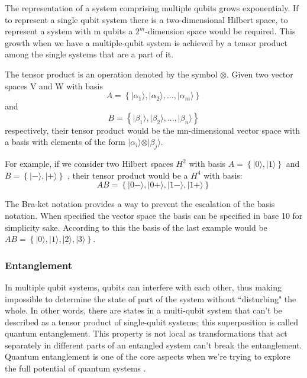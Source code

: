 The representation of a system comprising multiple qubits grows exponentialy. If to represent a single qubit system there is a two-dimensional Hilbert space, to represent a system with m qubits a $2^m$-dimension space would be required. This growth when we have a multiple-qubit system is achieved by a tensor product among the single systems that are a part of it.

The tensor product is an operation denoted by the symbol $\otimes$. 
Given two vector spaces V and W with basis 
\begin{equation}
A = \left\{ \vert \alpha_{1} \rangle, \vert \alpha_{2} \rangle , ..., \vert \alpha_{m} \rangle \right\}\end{equation} and 
\begin{equation} B = \left\{ \vert \beta_{1} \rangle, \vert \beta_{2} \rangle , ..., \vert \beta_{n} \rangle \right\}\end{equation} respectively, their tensor product would be the mn-dimensional vector space with a basis with elements of the form $ \vert \alpha_{i} \rangle \otimes \vert \beta_{j} \rangle$\cite{Rieffel2011}.

For example, if we consider two Hilbert spaces $H^2$ with basis
$ A=\left\{ \vert 0 \rangle , \vert 1 \rangle \right\}$ and 
$B =\left\{ \vert - \rangle, \vert + \rangle \right\}$
, their tensor product would be a $H^4$ with basis:
\begin{equation}
AB = \left\{ \vert 0  - \rangle, \vert 0 + \rangle, \vert 1 - \rangle,  \vert 1 + \rangle \right\}
\end{equation}

The Bra-ket notation provides a way to prevent the escalation of the basis notation. When specified the vector space the basis can be specified in base 10 for simplicity sake. According to this the basis of the last example would be $AB = \left\{ \vert 0 \rangle, \vert 1 \rangle, \vert 2 \rangle,  \vert 3 \rangle \right\}$.

\subsubsection{Entanglement}
In multiple qubit systems, qubits can interfere with each other, thus making impossible to determine the state of part of the system without ``disturbing" the whole. In other words, there are states in a multi-qubit system that can't be described as a tensor product of single-qubit systems; this superposition is called quantum entanglement. This property is not local as transformations that act separately in different parts of an entangled system can't break the entanglement. Quantum entanglement is one of the core aspects when we're trying to explore the full potential of quantum systems \cite{Rieffel2011}.

